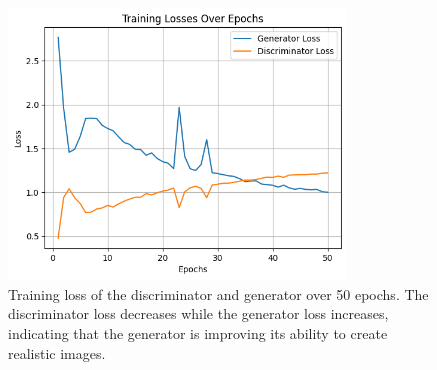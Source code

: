 \documentclass{article}
\begin{document}
\begin{figure}[h!]
    \centering
    \includegraphics[width=0.8\textwidth]{images/disc_gen_loss.png}
    \caption{Training loss of the discriminator and generator over 50 epochs. The discriminator loss decreases while the generator loss increases, indicating that the generator is improving its ability to create realistic images.}
    \label{fig:clip_loss}
\end{figure}
\end{document}

